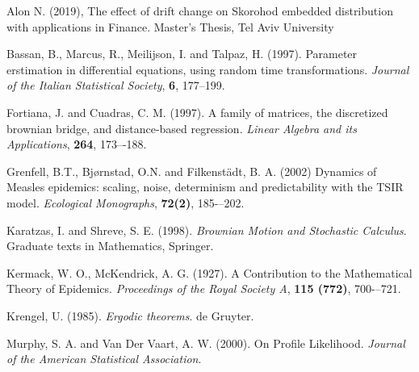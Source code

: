 \documentclass{article}
\begin{document}
\begin{thebibliography}{99}

 Alon N. (2019), The effect of drift change on Skorohod embedded
distribution with applications in Finance. Master’s Thesis, Tel Aviv
University

 Bassan, B., Marcus, R., Meilijson, I. and Talpaz, H. (1997). Parameter erstimation in differential equations, using random time transformations. {\em Journal of the Italian Statistical Society}, {\bf 6}, 177--199.

 Fortiana, J. and Cuadras, C. M. (1997). A family of matrices, the
discretized brownian bridge, and distance-based regression. {\em Linear
Algebra and its Applications}, {\bf 264}, 173–-188.

 Grenfell, B.T., Bj{\o}rnstad, O.N. and Filkenst\"{a}dt, B. A. (2002) Dynamics of Measles epidemics: scaling, noise, determinism and predictability with the TSIR model. {\em Ecological Monographs}, {\bf 72(2)}, 185-–202.

 Karatzas, I. and Shreve, S. E. (1998). {\em Brownian Motion and Stochastic Calculus}. Graduate texts in Mathematics, Springer.

  Kermack, W. O., McKendrick, A. G. (1927). A Contribution to the Mathematical Theory of Epidemics. {\em Proceedings of the Royal Society A}, {\bf 115 (772)}, 700-–721.

 Krengel, U. (1985). {\em Ergodic theorems}. de Gruyter.

 Murphy, S. A. and  Van Der Vaart, A. W. (2000). On Profile Likelihood. {\em Journal of the American Statistical Association}.
\end{thebibliography}
\end{document}
